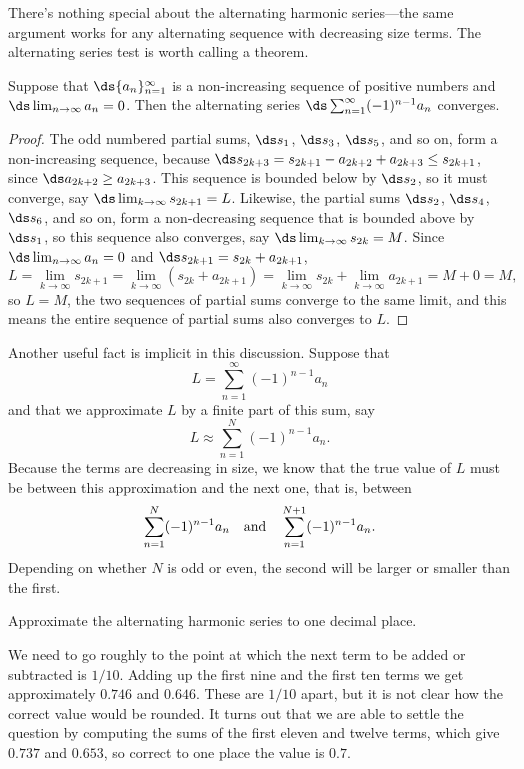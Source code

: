 There's nothing special about the alternating harmonic series---the
same argument works for any alternating sequence with decreasing size
terms. The alternating series test is worth calling a theorem.

\begin{theorem} Suppose that $\ds\{a_n\}_{n=1}^\infty$ is a non-increasing
sequence of positive numbers and $\ds\lim_{n\to\infty}a_n=0$. Then the
alternating series $\ds\sum_{n=1}^\infty (-1)^{n-1} a_n$ converges.

\begin{proof} The odd numbered partial sums, $\ds s_1$, $\ds s_3$, $\ds s_5$,
and so on, form a non-increasing sequence, because
$\ds s_{2k+3}=s_{2k+1}-a_{2k+2}+a_{2k+3}\le s_{2k+1}$, since
$\ds a_{2k+2}\ge a_{2k+3}$. This sequence is bounded below by
$\ds s_2$, so it must converge, say 
$\ds\lim_{k\to\infty}s_{2k+1}=L$.
Likewise, the partial sums $\ds s_2$, $\ds s_4$, $\ds s_6$,
and so on, form a non-decreasing sequence that is bounded above by
$\ds s_1$, so this sequence also converges, say 
$\ds\lim_{k\to\infty}s_{2k}=M$. Since $\ds\lim_{n\to\infty} a_n=0$ and
$\ds s_{2k+1}= s_{2k}+a_{2k+1}$,
$$
  L=\lim_{k\to\infty}s_{2k+1}=\lim_{k\to\infty}(s_{2k}+a_{2k+1})=
  \lim_{k\to\infty}s_{2k}+\lim_{k\to\infty}a_{2k+1}=M+0=M,
$$
so $L=M$, the two sequences of partial sums converge to the same
limit, and this means the entire sequence of partial sums also
converges to $L$.
\end{proof}

Another useful fact is implicit in this discussion. Suppose that 
$$L=\sum_{n=1}^\infty (-1)^{n-1} a_n$$
and that we approximate $L$ by a finite part of this sum, say
$$L\approx \sum_{n=1}^N (-1)^{n-1} a_n.$$
Because the terms are decreasing in size, we know that the true value
of $L$ must be between this approximation and the next one, that is,
between 
$$
  \sum_{n=1}^N (-1)^{n-1} a_n \hbox{\quad and\quad}
  \sum_{n=1}^{N+1} (-1)^{n-1} a_n.
$$
Depending on whether $N$ is odd or even, the second will be larger or
smaller than the first.

\begin{example}
Approximate the alternating harmonic series to one decimal place.

We need to go roughly to the point at which the next term to be added
or subtracted is $1/10$. Adding up the first nine and the first ten
terms we get approximately $0.746$ and $0.646$. These are $1/10$
apart, but it is not clear how the correct value would be rounded. It
turns out that we are able to settle the question by computing the
sums of the first eleven and twelve terms, which give
$0.737$ and $0.653$, so correct to one place the value is $0.7$.
\end{example}


\end{theorem}
